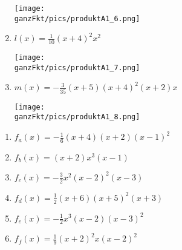 \begin{Answer}[ref=ganzProduktA1]
\begin{minipage}{\textwidth}
\begin{minipage}{0.5\textwidth}
\begin{enumerate}[label=\alph*)]
                \begin{minipage}[t]{0.8\textwidth}
					\texttt{[image: \\ganzFkt/pics/produktA1\_6.png]}
				\end{minipage}%
				\item \(l(x)=\frac{1}{10}\left( x+4\right) ^2 x^2\)

                \begin{minipage}[t]{0.8\textwidth}
					\texttt{[image: \\ganzFkt/pics/produktA1\_7.png]}
				\end{minipage}%
				\item \(m(x)=-\frac{3}{35}\left( x+5\right) \left( x+4\right) ^2\left( x+2\right) x\)

                \begin{minipage}[t]{0.8\textwidth}
					\texttt{[image: \\ganzFkt/pics/produktA1\_8.png]}
				\end{minipage}%
			\end{enumerate}
		\end{minipage}%
	\end{minipage}%
\end{Answer}\newpage
\begin{Answer}[ref=ganzProduktA2]

	\begin{minipage}{\textwidth}
		\begin{minipage}[t]{0.5\textwidth}
			\begin{enumerate}[label=\alph*)]
				\item \(f_a(x)=-\frac{1}{6}\left(x+4\right) \left(x+2\right) \left(x-1\right)^2 \)
				\item \(f_b(x)=\left(x+2\right)x^3\left(x-1\right) \)
				\item \(f_c(x)=-\frac{3}{2}x^2\left(x-2\right)^2 \left(x-3\right) \)
			\end{enumerate}
		\end{minipage}%
		\begin{minipage}[t]{0.5\textwidth}
			\begin{enumerate}[label=\alph*)]
				\setcounter{enumi}{3}
				\item \(f_d(x)=\frac{1}{2}\left(x+6\right) \left(x+5\right)^2 \left(x+3\right) \)
				\item \(f_e(x)=-\frac{1}{2}x^3\left(x-2\right) \left(x-3\right)^2 \)
				\item \(f_f(x)=\frac{1}{9}\left(x+2\right)^2 x\left(x-2\right)^2 \)
			\end{enumerate}
		\end{minipage}%
	\end{minipage}%
\end{Answer}